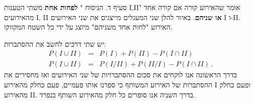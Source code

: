 \documentclass[12pt,a4paper]{article}
\begin{document}
סעיף ד. הניסוח "%
\textbf{לפחות אחת}
משתי הטענות I,II" אומר שהאירוע קורה אם קורה אחד מהאירועים I, II
\textbf{או שניהם}.
באיור להלן שני המעגלים מייצגים את שני האירועים I ו-II. האירוע "לחות אחד משניהם" מיוצג על ידי כל השטח המקווקו.
\begin{center}
\end{center}
 יש שתי דרכים לחשב את ההסתברות:
\begin{eqnarray*}
P(I \cup II) &=& P(I) + P(II) - P(I \cap II)\\
P(I \cup II) &=& P(I/ II) + P(II/ I) - P(I \cap II)\,.
\end{eqnarray*}
בדרך הראשונה אנו לוקחים את סכום ההסתברויות של שני האירועים ואז מחסירים את ההסתברות של האירוע המשותף כי ספרנו אותו פעמיים, פעם כחלק מהאירוע I ופעם כחלק מהאירוע II. בדרך השניה אנו סופרים כל חלק מהאירוע השותף בנפרד.
\end{document}
